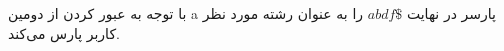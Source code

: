 با توجه به عبور کردن از دومین
a
پارسر در نهایت 
$abdf\$$
را به عنوان رشته مورد نظر کاربر پارس می‌کند.